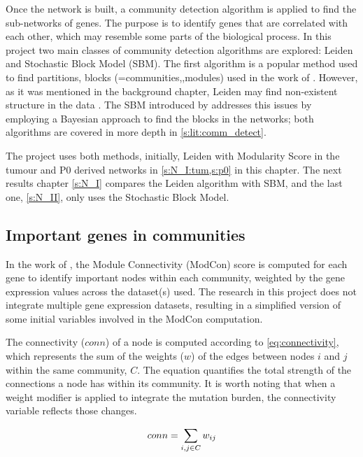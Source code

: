 Once the network is built, a community detection algorithm is applied to find the sub-networks of genes. The purpose is to identify genes that are correlated with each other, which may resemble some parts of the biological process. In this project two main classes of community detection algorithms are explored: Leiden and Stochastic Block Model (SBM). The first algorithm is a popular method used to find partitions, blocks (=communities,,modules) used in the work of \citet{Care2019-ij}. However, as it was mentioned in the background chapter, Leiden may find non-existent structure in the data \citep{Peixoto2021-jx}. The SBM introduced by \citet{Peixoto2019-fg} addresses this issues by employing a Bayesian approach to find the blocks in the networks; both algorithms are covered in more depth in \cref{s:lit:comm_detect}.

The project uses both methods, initially, Leiden with Modularity Score in the tumour and P0 derived networks in \cref{s:N_I:tum,s:p0} in this chapter. The next results chapter \cref{s:N_I} compares the Leiden algorithm with SBM, and the last one, \cref{s:N_II}, only uses the Stochastic Block Model.


\subsection{Important genes in communities} \label{s:N_I:methods_modcon}

In the work of \citet{Care2019-ij}, the Module Connectivity (ModCon) score is computed for each gene to identify important nodes within each community, weighted by the gene expression values across the dataset(s) used. The research in this project does not integrate multiple gene expression datasets, resulting in a simplified version of some initial variables involved in the ModCon computation.

The connectivity ($conn$) of a node is computed according to \cref{eq:connectivity}, which represents the sum of the weights ($w$) of the edges between nodes $i$ and $j$ within the same community, $C$. The equation quantifies the total strength of the connections a node has within its community. It is worth noting that when a weight modifier is applied to integrate the mutation burden, the connectivity variable reflects those changes.

\begin{equation} \label{eq:connectivity}
    conn = \sum_{\substack{i, j \in C}} w_{ij} \\
\end{equation}

